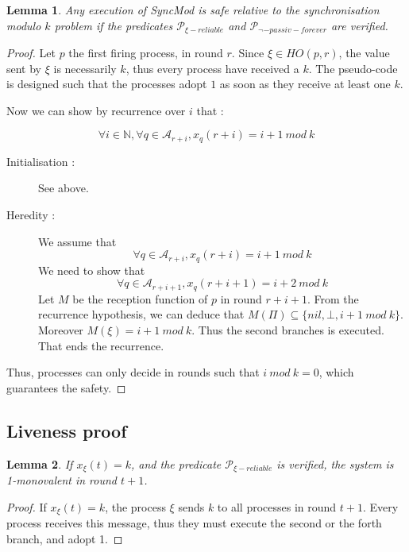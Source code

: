\documentclass{article}
\newtheorem{lemma}{Lemma}[section]
\begin{document}
\begin{lemma}\label{lem:safety}
	Any execution of SyncMod is safe relative to the synchronisation modulo $k$ problem
	if the predicates $\mathcal{P}_{\xi-reliable}$ and $\mathcal{P}_{\neg-passiv-forever}$ are verified.
\end{lemma}
\begin{proof}
	Let $p$ the first firing process, in round $r$.
	Since $\xi \in HO(p,r)$, the value sent by $\xi$ is necessarily $k$, thus every process have received a $k$.
	The pseudo-code is designed such that the processes adopt $1$ as soon as they receive at least one $k$.

	Now we can show by recurrence over $i$ that :

	$$\forall i \in \mathds{N}, \forall q \in \mathcal{A}_{r+i}, x_q(r+i) = i + 1~mod~k$$

	\begin{description}
		\item[Initialisation :] See above.
		\item[Heredity :] We assume that 
		$$\forall q \in \mathcal{A}_{r+i}, x_q(r+i) = i + 1~mod~k$$
	We need to show that 
	$$\forall q \in \mathcal{A}_{r+i+1}, x_q(r+i+1) = i + 2~mod~k$$
	Let $M$ be the reception function of $p$ in round $r+i+1$.
			From the recurrence hypothesis, we can deduce that $M(\Pi) \subseteq \{nil, \bot, i+1~mod~k\}$.
			Moreover $M(\xi) = i+1~mod~k$.
			Thus the second branches is executed. That ends the recurrence.
	\end{description}

	Thus, processes can only decide in rounds such that $i~mod~k = 0$, which guarantees the safety.
\end{proof}

\subsection{Liveness proof}

\begin{lemma}\label{lem:k_mono}
	If $x_\xi(t) = k$, and the predicate $\mathcal{P}_{\xi-reliable}$ is verified, the system is 1-monovalent in round $t+1$.
\end{lemma}
\begin{proof}
	If $x_\xi(t) = k$, the process $\xi$ sends $k$ to all processes in round $t+1$.
	Every process receives this message, thus they must execute the second or the forth branch, and adopt 1.
\end{proof}
\end{document}
